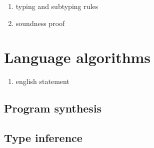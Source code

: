 \documentclass[manuscript]{acmart}
\begin{document}
\begin{enumerate}
  \item typing and subtyping rules 
  \item soundness proof 
\end{enumerate}

\section{Language algorithms}
\begin{enumerate}
  \item english statement 
\end{enumerate}
\subsection{Program synthesis}
\subsection{Type inference}
\end{document}
